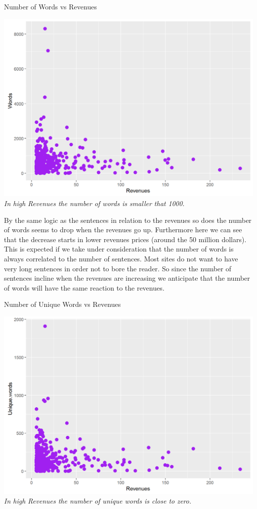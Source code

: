 \documentclass{article}
\begin{document}
\begin{table}[H]
\centering
\caption{Number of Words vs Revenues}
\begin{center}
\includegraphics[scale=0.5]{../R/photos/37_w_rev.png}   \\
\textit{In high Revenues the number of words is smaller that 1000.}
\end{center}
\end{table}
By the same logic as the sentences in relation to the revenues so does the number of words seems to drop when the revenues go up. Furthermore here we can see that the decrease starts in lower revenues prices (around the 50 million dollars). This is expected if we take under consideration that the number of words is always correlated to the number of sentences. Most sites do not want to have very long sentences in order not to bore the reader. So since the number of sentences incline when the revenues are increasing we anticipate that the number of words will have the same reaction to the revenues.
\begin{table}[H]
\centering
\caption{Number of Unique Words vs Revenues}
\begin{center}
\includegraphics[scale=0.5]{../R/photos/35_uw_rev.png}    \\
\textit{In high Revenues the number of unique words is close to zero.}
\end{center}
\end{table}
\end{document}

